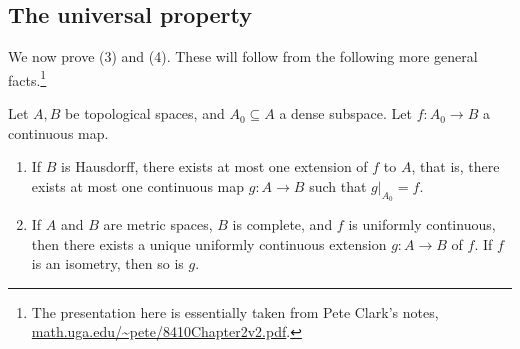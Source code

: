 
\subsection{The universal property}

We now prove (3) and (4). These will follow from the following more
general facts.\footnote{The presentation here is essentially taken
  from Pete Clark's notes,
  \url{math.uga.edu/~pete/8410Chapter2v2.pdf}.}

\begin{lemma}
  Let $A,B$ be topological spaces, and $A_0 \subseteq A$ a dense
  subspace. Let $f : A_0 \to B$ a continuous map.
  \begin{enumerate}
  \item If $B$ is Hausdorff, there exists at most one extension of $f$
    to $A$, that is, there exists at most one continuous map $g : A
    \to B$ such that $g|_{A_0} = f$.
  \item If $A$ and $B$ are metric spaces, $B$ is complete, and $f$ is
    uniformly continuous, then there exists a unique uniformly
    continuous extension $g : A \to B$ of $f$. If $f$ is an isometry,
    then so is $g$.
  \end{enumerate}
\end{lemma}

